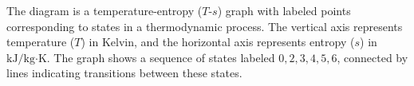 The diagram is a temperature-entropy (\( T \)-\( s \)) graph with labeled points corresponding to states in a thermodynamic process. The vertical axis represents temperature (\( T \)) in Kelvin, and the horizontal axis represents entropy (\( s \)) in \( \text{kJ}/\text{kg·K} \). The graph shows a sequence of states labeled \( 0, 2, 3, 4, 5, 6 \), connected by lines indicating transitions between these states.